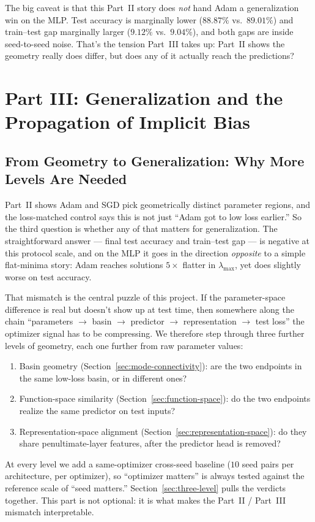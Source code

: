 \documentclass[11pt]{article}
\begin{document}
The big caveat is that this Part~II story does \emph{not} hand Adam a generalization win on the MLP. Test accuracy is marginally lower ($88.87\%$ vs.\ $89.01\%$) and train--test gap marginally larger ($9.12\%$ vs.\ $9.04\%$), and both gaps are inside seed-to-seed noise. That's the tension Part~III takes up: Part~II shows the geometry really does differ, but does any of it actually reach the predictions?

\FloatBarrier

\section{Part III: Generalization and the Propagation of Implicit Bias}
\label{sec:part3}

\subsection{From Geometry to Generalization: Why More Levels Are Needed}

Part~II shows Adam and SGD pick geometrically distinct parameter regions, and the loss-matched control says this is not just ``Adam got to low loss earlier.'' So the third question is whether any of that matters for generalization. The straightforward answer --- final test accuracy and train--test gap --- is negative at this protocol scale, and on the MLP it goes in the direction \emph{opposite} to a simple flat-minima story: Adam reaches solutions $5\times$ flatter in $\lambda_{\max}$, yet does slightly worse on test accuracy.

That mismatch is the central puzzle of this project. If the parameter-space difference is real but doesn't show up at test time, then somewhere along the chain ``parameters $\to$ basin $\to$ predictor $\to$ representation $\to$ test loss'' the optimizer signal has to be compressing. We therefore step through three further levels of geometry, each one further from raw parameter values:
\begin{enumerate}
\item Basin geometry (Section~\ref{sec:mode-connectivity}): are the two endpoints in the same low-loss basin, or in different ones?
\item Function-space similarity (Section~\ref{sec:function-space}): do the two endpoints realize the same predictor on test inputs?
\item Representation-space alignment (Section~\ref{sec:representation-space}): do they share penultimate-layer features, after the predictor head is removed?
\end{enumerate}
At every level we add a same-optimizer cross-seed baseline ($10$ seed pairs per architecture, per optimizer), so ``optimizer matters'' is always tested against the reference scale of ``seed matters.'' Section~\ref{sec:three-level} pulls the verdicts together. This part is not optional: it is what makes the Part~II / Part~III mismatch interpretable.
\end{document}
